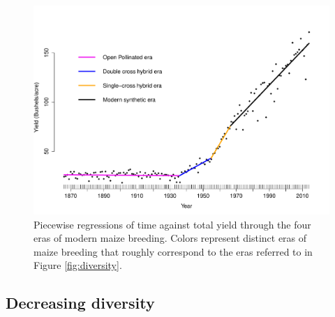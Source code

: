 \documentclass[draft,12pt]{article}
\begin{document}
\begin{figure}
\includegraphics[width=0.6\linewidth]{yield.pdf}
\caption{Piecewise regressions of time against total yield through the four eras of modern maize breeding. Colors represent distinct eras of maize breeding that roughly correspond to the eras  referred to in Figure \ref{fig:diversity}.} 
\label{fig:piecewise}
\end{figure}
 
%


\subsection*{Decreasing diversity} 
\end{document}
